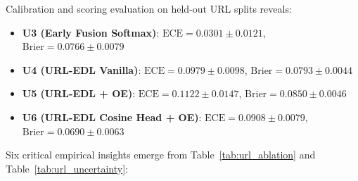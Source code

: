 \documentclass[conference]{IEEEtran}
\begin{document}
Calibration and scoring evaluation on held-out URL splits reveals:
\begin{itemize}
    \item \textbf{U3 (Early Fusion Softmax)}: $\text{ECE} = \mathbf{0.0301 \pm 0.0121}$, $\text{Brier} = 0.0766 \pm 0.0079$
    \item \textbf{U4 (URL-EDL Vanilla)}: $\text{ECE} = 0.0979 \pm 0.0098$, $\text{Brier} = 0.0793 \pm 0.0044$
    \item \textbf{U5 (URL-EDL + OE)}: $\text{ECE} = 0.1122 \pm 0.0147$, $\text{Brier} = 0.0850 \pm 0.0046$
    \item \textbf{U6 (URL-EDL Cosine Head + OE)}: $\text{ECE} = 0.0908 \pm 0.0079$, $\text{Brier} = \mathbf{0.0690 \pm 0.0063}$
\end{itemize}

Six critical empirical insights emerge from Table~\ref{tab:url_ablation} and Table~\ref{tab:url_uncertainty}:
\end{document}

